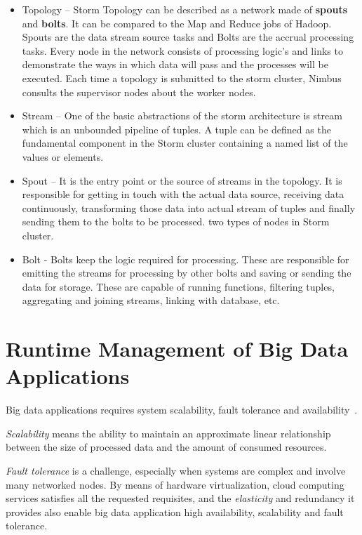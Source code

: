 \begin{itemize}
	\item Topology – Storm Topology can be described as a network made of \textbf{spouts} and \textbf{bolts}. It can be compared to the Map and Reduce jobs of Hadoop. Spouts are the data stream source tasks and Bolts are the accrual processing tasks. Every node in the network consists of processing logic’s and links to demonstrate the ways in which data will pass and the processes will be executed. Each time a topology is submitted to the storm cluster, Nimbus consults the supervisor nodes about the worker nodes. 
	\item Stream – One of the basic abstractions of the storm architecture is stream which is an unbounded pipeline of tuples. A tuple can be defined as the fundamental component in the Storm cluster containing a named list of the values or elements.  \item Spout – It is the entry point or the source of streams in the topology. It is responsible for getting in touch with the actual data source, receiving data continuously, transforming those data into actual stream of tuples and finally sending them to the bolts to be processed. two types of nodes in Storm cluster.
	\item Bolt - Bolts keep the logic required for processing. These are responsible for emitting the streams for processing by other bolts and saving or sending the data for storage. These are capable of running functions, filtering tuples, aggregating and joining streams, linking with database, etc.
\end{itemize}

\section{Runtime Management of Big Data Applications}\label{sec:runtime_mgmt_big_data_apps}
Big data applications requires system scalability, fault tolerance and  availability~\cite{articleBigData:2017}. 

\textit{Scalability} means the ability to maintain an approximate linear relationship between the size of processed data and the amount of consumed resources. 

\textit{Fault tolerance} is a challenge, especially when systems are complex and involve many networked nodes. By means of hardware virtualization, cloud computing services satisfies all the requested requisites, and the \textit{elasticity} and redundancy it provides  also enable big data application high availability, scalability and fault tolerance.

